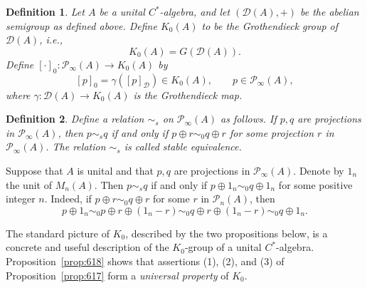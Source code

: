 \documentclass{book}
\newtheorem{definition}{Definition}[section]
\def\cstar{\(C^*\)-algebra}
\begin{document}
\begin{definition}
  Let \(A\) be a unital \cstar, and let \((\mathcal{D}(A),+)\) be the abelian semigroup as defined above.
  Define \(K_0(A)\) to be the Grothendieck group of \(\mathcal{D}(A)\), i.e.,
  \[
    K_0(A)=G(\mathcal{D}(A)).
  \]
  Define \({[\cdot]}_0:\mathcal{P}_\infty(A)\rightarrow K_0(A)\) by
  \begin{equation}
    {[p]}_0=\gamma({[p]_\mathcal{D}})\in K_0(A),\qquad p\in \mathcal{P}_\infty(A),
  \end{equation}
  where \(\gamma:\mathcal{D}(A)\rightarrow K_0(A)\) is the Grothendieck map.
\end{definition}
\begin{definition}\label{def:Lars616}
  Define a relation \(\sim_s\) on \(\mathcal{P}_\infty(A)\) as follows. If \(p, q\) are projections in \(\mathcal{P}_\infty(A)\), then
  \(p\sim_s q\) if and only if \(p\oplus r\sim_0 q\oplus r\) for some projection \(r\) in \(\mathcal{P}_\infty(A)\). The relation \(\sim_s\) is called \textnormal{stable equivalence}.
\end{definition}
Suppose that \(A\) is unital and that \(p, q\) are projections in \(\mathcal{P}_\infty(A)\). Denote by \(1_n\) the unit of \(M_n(A)\).
Then \(p\sim_s q\) if and only if \(p\oplus 1_n\sim_0 q\oplus 1_n\) for some positive integer \(n\). Indeed, if \(p\oplus r\sim_0 q\oplus r\) for some \(r\) in \(\mathcal{P}_n(A)\), then
\[
  p\oplus 1_n\sim_0 p\oplus r\oplus (1_n-r)\sim_0 q\oplus r\oplus (1_n-r)\sim_0 q\oplus 1_n.
\]\par
The standard picture of \(K_0\), described by the two propositions below, is a concrete and useful description of the \(K_0\)-group of a unital \cstar.
Proposition~\ref{prop:618} shows that assertions (1), (2), and (3) of Proposition~\ref{prop:617} form a \textit{universal property} of \(K_0\).
\end{document}
